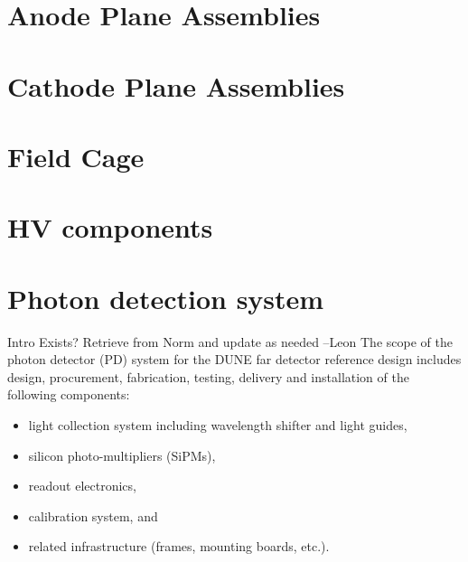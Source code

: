 

\section{Anode Plane Assemblies}

\section{Cathode Plane Assemblies}

\section{Field Cage}

\section{HV components}

\section{Photon detection system}

Intro  Exists?  Retrieve from Norm and update as needed --Leon
The scope of the photon detector (PD) system for the DUNE far detector
reference design includes design, procurement, fabrication,
testing, delivery and installation of the following components:
\begin{itemize}
\item light collection system including wavelength shifter and light guides,
\item silicon photo-multipliers (SiPMs),
\item readout electronics,
\item calibration system, and
\item related infrastructure (frames, mounting boards, etc.).
\end{itemize}

